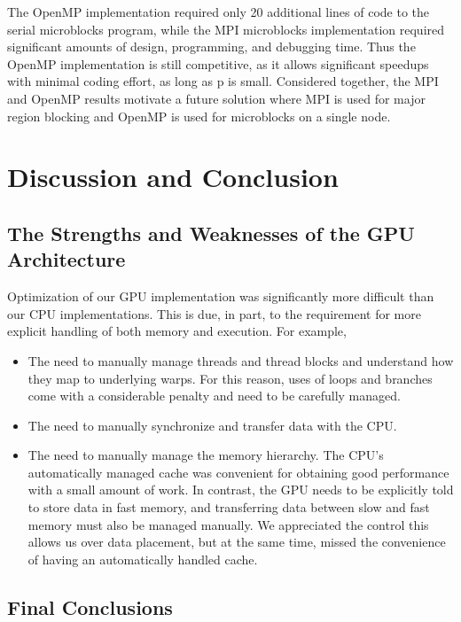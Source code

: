 \documentclass[11pt]{article} %
\begin{document}
The OpenMP implementation required only 20 additional lines of code to the serial microblocks program, while the MPI microblocks implementation required significant amounts of design, programming, and debugging time. Thus the OpenMP implementation is still competitive, as it allows significant speedups with minimal coding effort, as long as p is small. Considered together, the MPI and OpenMP results motivate a future solution where MPI is used for major region blocking and OpenMP is used for microblocks on a single node.

\section{Discussion and Conclusion}
\label{conclusion-section}

\subsection{The Strengths and Weaknesses of the GPU Architecture}
Optimization of our GPU implementation was significantly more difficult
than our CPU implementations. This is due, in part, to the requirement
for more explicit handling of both memory and execution. For example,
\begin{itemize}
\item The need to manually manage threads and thread blocks and understand
how they map to underlying warps. For this reason, uses of loops and
branches come with a considerable penalty and need to be carefully
managed.
\item The need to manually synchronize and transfer data with the CPU.
\item The need to manually manage the memory hierarchy. The CPU's automatically
managed cache was convenient for obtaining good performance with a
small amount of work. In contrast, the GPU needs to be explicitly
told to store data in fast memory, and transferring data between slow
and fast memory must also be managed manually. We appreciated the
control this allows us over data placement, but at the same time,
missed the convenience of having an automatically handled cache.\end{itemize}

\subsection{Final Conclusions}
\end{document}
